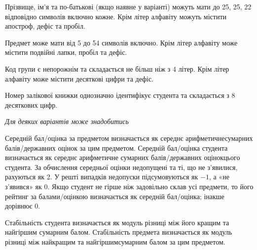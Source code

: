 \documentclass[11pt, ukrainian]{article}
\begin{document}
Прізвище, ім’я та по-батькові (якщо наявне у варіанті) можуть мати до 25, 25, 22 відповідно символів включно кожне. 
Крім літер алфавіту можуть містити апостроф, дефіс та пробіл.

Предмет може мати від 5 до 54 символів включно. 
Крім літер алфавіту може містити подвійні лапки, пробіл та дефіс.

Код групи є непорожнім та складається не більш ніж з 4 літер. 
Крім літер алфавіту може містити десяткові цифри та дефіс.


Номер залікової книжки однозначно ідентифікує студента та складається з 8 десяткових цифр. 

\bigskip\textit{Для деяких варіантів може знадобитись}

Середній бал/оцінка за предметом визначається як середнє арифметичнесумарних балів/державних оцінок за цим предметом. 
Середній бал/оцінка студента визначається як середнє арифметичне сумарних балів/державних оцінокцього студента. 
За обчислення середньої оцінки недопущені та ті, що не з’явилися, рахуються як 2.
У решті випадків недопуски підсумовуються як $-1$, а «не з’явився» як 0.
Якщо студент не гірше ніж задовільно склав усі предмети, 
то його рейтинг за балами/оцінкою визначається як середній бал/оцінка; інакше дорівнює 0.

Стабільність студента визначається як модуль різниці між його кращим та найгіршим сумарним балом.
Стабільність предмета визначається як модуль різниці між найкращим та найгіршимсумарним балом за цим предметом.




\par
\newpage
\end{document}
